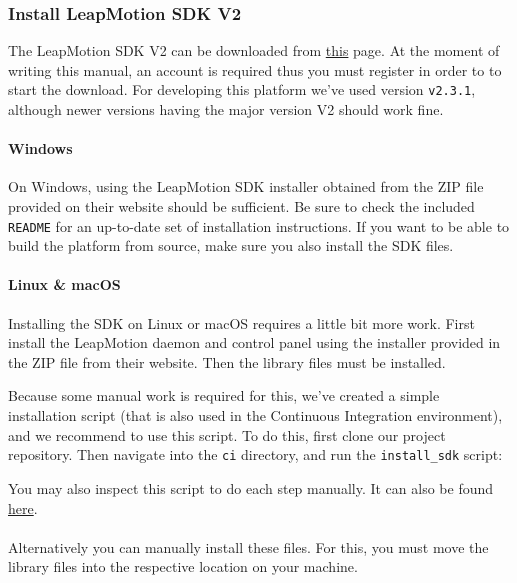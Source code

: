 \documentclass{standalone}
\begin{document}
  \subsubsection{Install LeapMotion SDK V2}
  The LeapMotion SDK V2 can be downloaded from
  \href{https://developer.leapmotion.com/sdk/v2}{this} page. At the moment of
  writing this manual, an account is required thus you must register in order
  to to start the download. For developing this platform we've used version
  \verb_v2.3.1_, although newer versions having the major version V2 should work
  fine.

  \paragraph{Windows}
  On Windows, using the LeapMotion SDK installer obtained from the ZIP file
  provided on their website should be sufficient. Be sure to check the included
  \verb_README_ for an up-to-date set of installation instructions. If you
  want to be able to build the platform from source, make sure you also install
  the SDK files.

  \paragraph{Linux \& macOS}
  Installing the SDK on Linux or macOS requires a little bit more work.
  First install the LeapMotion daemon and control panel using the installer
  provided in the ZIP file from their website. Then the library files must be
  installed.

  Because some manual work is required for this, we've created a simple
  installation script (that is also used in the Continuous Integration
  environment), and we recommend to use this script. To do this, first clone our
  project repository. Then navigate into the \verb_ci_ directory, and run the
  \verb`install_sdk` script:
  
  You may also inspect this script to do each step manually. It can also be
  found \href{https://gitlab.com/timvisee/cant-touch-this/blob/ece65fab15b3c088e57628dc0c82474efddbbfd2/ci/install_sdk}{here}.

  \paragraph{}
  Alternatively you can manually install these files. For this, you must move the library
  files into the respective location on your machine.
  
\end{document}
